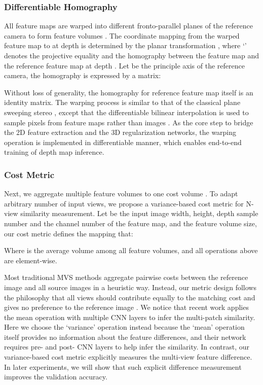 \documentclass[runningheads]{llncs}
\begin{document}
\vspace{-3mm}
\subsubsection{Differentiable Homography} All feature maps are warped into different fronto-parallel planes of the reference camera to form  feature volumes . The coordinate mapping from the warped feature map  to  at depth  is determined by the planar transformation , where `' denotes the projective equality and  the homography between the  feature map and the reference feature map at depth . Let  be the principle axis of the reference camera, the homography is expressed by a  matrix:
	
Without loss of generality, the homography for reference feature map  itself is an  identity matrix. The warping process is similar to that of the classical plane sweeping stereo \cite{collins1996space}, except that the differentiable bilinear interpolation is used to sample pixels from feature maps  rather than images . As the core step to bridge the 2D feature extraction and the 3D regularization networks, the warping operation is implemented in differentiable manner, which enables end-to-end training of depth map inference. 

\vspace{-3mm}
\subsubsection{Cost Metric} Next, we aggregate multiple feature volumes  to one cost volume . To adapt arbitrary number of input views, we propose a variance-based cost metric  for N-view similarity measurement.
	Let  be the input image width, height, depth sample number and the channel number of the feature map, and  the feature volume size, our cost metric defines the mapping  that: 
	
Where  is the average volume among all feature volumes, and all operations above are element-wise. 

Most traditional MVS methods aggregate pairwise costs between the reference image and all source images in a heuristic way. Instead, our metric design follows the philosophy that all views should contribute equally to the matching cost and gives no preference to the reference image \cite{hartmann2017learned}. We notice that recent work \cite{hartmann2017learned} applies the mean operation with multiple CNN layers to infer the multi-patch similarity. Here we choose the `variance' operation instead because the `mean' operation itself provides no information about the feature differences, and their network requires pre- and post- CNN layers to help infer the similarity. In contrast, our variance-based cost metric explicitly measures the multi-view feature difference. In later experiments, we will show that such explicit difference measurement improves the validation accuracy.
\end{document}
